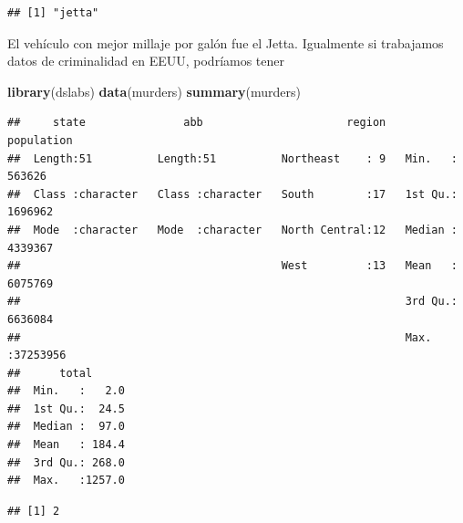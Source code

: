 \documentclass[
]{article}
\newenvironment{Shaded}{\begin{snugshade}}{\end{snugshade}}
\newcommand{\CommentTok}[1]{\textcolor[rgb]{0.56,0.35,0.01}{\textit{#1}}}
\newcommand{\FunctionTok}[1]{\textcolor[rgb]{0.13,0.29,0.53}{\textbf{#1}}}
\newcommand{\NormalTok}[1]{#1}
\newcommand{\OtherTok}[1]{\textcolor[rgb]{0.56,0.35,0.01}{#1}}
\newcommand{\SpecialCharTok}[1]{\textcolor[rgb]{0.81,0.36,0.00}{\textbf{#1}}}
\begin{document}
\begin{Shaded}
\end{Shaded}

\begin{verbatim}
## [1] "jetta"
\end{verbatim}

El vehículo con mejor millaje por galón fue el Jetta. Igualmente si
trabajamos datos de criminalidad en EEUU, podríamos tener

\begin{Shaded}
\begin{Highlighting}[]
\FunctionTok{library}\NormalTok{(dslabs)}
\FunctionTok{data}\NormalTok{(murders)}
\FunctionTok{summary}\NormalTok{(murders)}
\end{Highlighting}
\end{Shaded}

\begin{verbatim}
##     state               abb                      region     population      
##  Length:51          Length:51          Northeast    : 9   Min.   :  563626  
##  Class :character   Class :character   South        :17   1st Qu.: 1696962  
##  Mode  :character   Mode  :character   North Central:12   Median : 4339367  
##                                        West         :13   Mean   : 6075769  
##                                                           3rd Qu.: 6636084  
##                                                           Max.   :37253956  
##      total       
##  Min.   :   2.0  
##  1st Qu.:  24.5  
##  Median :  97.0  
##  Mean   : 184.4  
##  3rd Qu.: 268.0  
##  Max.   :1257.0
\end{verbatim}

\begin{Shaded}
\end{Shaded}

\begin{verbatim}
## [1] 2
\end{verbatim}
\end{document}
